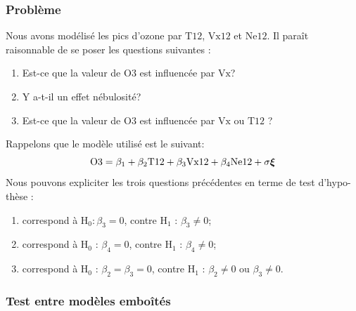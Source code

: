\begin{frame}
\frametitle{Problème}
Nous avons modélisé les pics d'ozone par $\mathrm{T12}$, $\mathrm{Vx12}$ et $\mathrm{Ne12}$.
Il para\^{i}t raisonnable de se poser les questions suivantes :
\begin{enumerate}
\item Est-ce que la valeur de $\mathrm{O3}$ est influenc\'{e}e par $\mathrm{Vx}$?
\item Y a-t-il un effet n\'{e}bulosit\'{e}?
\item Est-ce que la valeur de $\mathrm{O3}$ est influenc\'{e}e par $\mathrm{Vx}$ ou $\mathrm{T12}$ ?
\end{enumerate}
Rappelons que le mod\`{e}le utilis\'{e} est le suivant:
\[
\mathrm{O3}= \beta_1 + \beta_2 \mathrm{T12} + \beta_3 \mathrm{Vx12} + \beta_4 \mathrm{Ne12} + \sigma \boldsymbol{\xi}
\]
Nous pouvons expliciter les trois questions pr\'{e}c\'{e}dentes en terme de test d'hypo- th\`{e}se :
\begin{enumerate}
\item correspond \`{a} $\mathrm{H}_{0}:\beta_{3}=0$, contre $\mathrm{H}_{1}$ : $\beta_{3}\neq 0$;
\item  correspond \`{a} $\mathrm{H}_{0}$ : $\beta_{4}=0$, contre $\mathrm{H}_{1}$ : $\beta_{4}\neq 0$;
\item correspond \`{a} $\mathrm{H}_{0}$ : $\beta_{2}=\beta_{3}=0$, contre $\mathrm{H}_{1}$ : $\beta_{2}\neq 0$ ou $\beta_{3}\neq 0$.
\end{enumerate}
\end{frame}

\begin{frame}
\frametitle{Test entre mod\`{e}les embo\^{i}t\'{e}s}
\end{frame}


